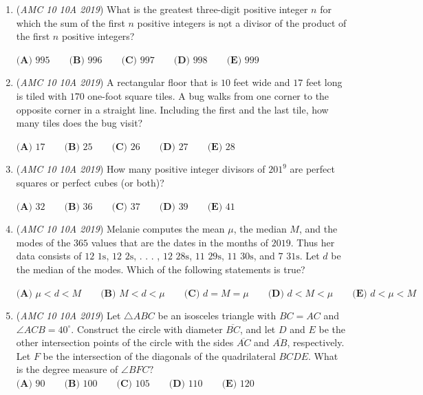 \begin{enumerate}
	\item (\textit{AMC 10 10A 2019}) What is the greatest three-digit positive integer $n$ for which the sum of the first $n$ positive integers is $\underline{\text{not}}$ a divisor of the product of the first $n$ positive integers?


 $\textbf{(A) } 995 \qquad\textbf{(B) } 996 \qquad\textbf{(C) } 997 \qquad\textbf{(D) } 998 \qquad\textbf{(E) } 999$


	\item (\textit{AMC 10 10A 2019}) A rectangular floor that is $10$ feet wide and $17$ feet long is tiled with $170$ one-foot square tiles. A bug walks from one corner to the opposite corner in a straight line. Including the first and the last tile, how many tiles does the bug visit?


 $\textbf{(A) } 17 \qquad\textbf{(B) } 25 \qquad\textbf{(C) } 26 \qquad\textbf{(D) } 27 \qquad\textbf{(E) } 28$


	\item (\textit{AMC 10 10A 2019}) How many positive integer divisors of $201^9$ are perfect squares or perfect cubes (or both)?


 $\textbf{(A) } 32 \qquad\textbf{(B) } 36 \qquad\textbf{(C) } 37 \qquad\textbf{(D) } 39 \qquad\textbf{(E) } 41$


	\item (\textit{AMC 10 10A 2019}) Melanie computes the mean $\mu$, the median $M$, and the modes of the $365$ values that are the dates in the months of $2019$. Thus her data consists of $12$ $1\text{s}$, $12$ $2\text{s}$, . . . , $12$ $28\text{s}$, $11$ $29\text{s}$, $11$ $30\text{s}$, and $7$ $31\text{s}$. Let $d$ be the median of the modes. Which of the following statements is true?


 $\textbf{(A) } \mu < d < M \qquad\textbf{(B) } M < d < \mu \qquad\textbf{(C) } d = M =\mu \qquad\textbf{(D) } d < M < \mu \qquad\textbf{(E) } d < \mu < M$


	\item (\textit{AMC 10 10A 2019}) Let $\triangle ABC$ be an isosceles triangle with $BC = AC$ and $\angle ACB = 40^{\circ}$. Construct the circle with diameter $\overline{BC}$, and let $D$ and  $E$ be the other intersection points of the circle with the sides $\overline{AC}$ and $\overline{AB}$, respectively. Let $F$ be the intersection of the diagonals of the quadrilateral $BCDE$. What is the degree measure of $\angle BFC ?$
$\textbf{(A) } 90 \qquad\textbf{(B) } 100 \qquad\textbf{(C) } 105 \qquad\textbf{(D) } 110 \qquad\textbf{(E) } 120$



\end{enumerate}

